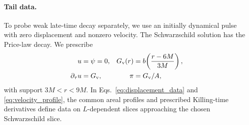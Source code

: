 \documentclass[
 aps,
 prd,
 reprint,
 superscriptaddress,
 nofootinbib,
 longbibliography
]{revtex4-2}
\begin{document}
\paragraph{Tail data.}
To probe weak late-time decay separately, we use an initially dynamical
pulse with zero displacement and nonzero velocity.  The Schwarzschild solution has the Price-law decay. We prescribe
\begin{equation}
 \begin{aligned}
 u&=\psi=0, &G_{\rm v}(r)&=b\!\left(\frac{r-6M}{3M}\right),\\
 \partial_\tau u&=G_{\rm v}, &\pi&=G_{\rm v}/A,
 \end{aligned}
 \label{eq:velocity_profile}
\end{equation}
with support $3M<r<9M$.  In Eqs.~\eqref{eq:displacement_data} and
\eqref{eq:velocity_profile}, the common areal profiles and prescribed
Killing-time derivatives define data on $L$-dependent slices approaching the
chosen Schwarzschild slice.
\end{document}
